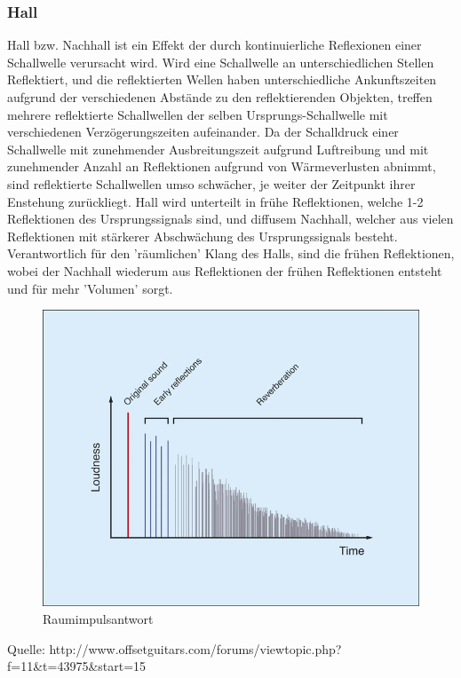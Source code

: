 \documentclass[a4paper,12pt,fontsize=12,DIV=12]{scrartcl}
\begin{document}
\subsubsection{Hall}
Hall bzw. Nachhall ist ein Effekt der durch kontinuierliche Reflexionen einer Schallwelle verursacht wird.
Wird eine Schallwelle an unterschiedlichen Stellen Reflektiert, und die reflektierten Wellen haben unterschiedliche Ankunftszeiten aufgrund der verschiedenen Abstände zu den reflektierenden Objekten, treffen mehrere reflektierte Schallwellen der selben Ursprungs-Schallwelle mit verschiedenen Verzögerungszeiten aufeinander. Da der Schalldruck einer Schallwelle mit zunehmender Ausbreitungszeit aufgrund Luftreibung und mit zunehmender Anzahl an Reflektionen aufgrund von Wärmeverlusten abnimmt, sind reflektierte Schallwellen umso schwächer, je weiter der Zeitpunkt ihrer Enstehung zurückliegt.
Hall wird unterteilt in frühe Reflektionen, welche 1-2 Reflektionen des Ursprungssignals sind, und diffusem Nachhall, welcher aus vielen Reflektionen mit stärkerer Abschwächung des Ursprungssignals besteht. Verantwortlich für den 'räumlichen' Klang des Halls, sind die frühen Reflektionen, wobei der Nachhall wiederum aus Reflektionen der frühen Reflektionen entsteht und für mehr 'Volumen' sorgt.


\begin{figure}[h]
	\includegraphics[scale=0.5]{Bilder/raumimpulsantwort.jpg}
	\caption{Raumimpulsantwort}
	\label{labelname}
\end{figure}
Quelle: http://www.offsetguitars.com/forums/viewtopic.php?f=11\&t=43975\&start=15
\end{document}
